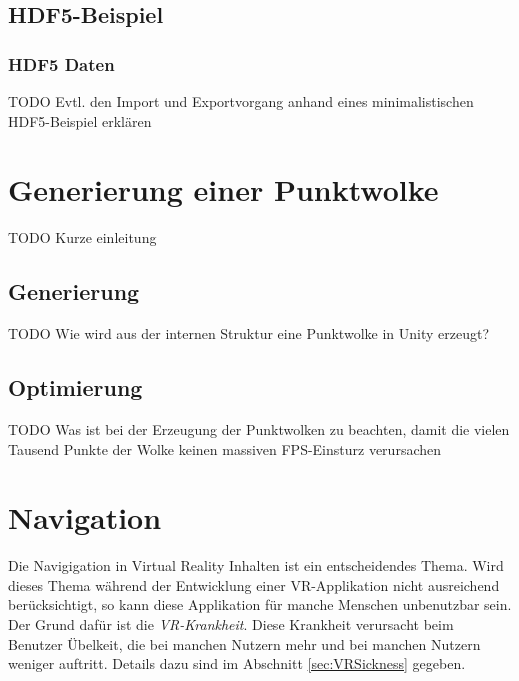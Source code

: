 \subsection{HDF5-Beispiel}
\subsubsection{HDF5 Daten}
\label{sec:HDF5}
TODO Evtl. den Import und Exportvorgang anhand eines minimalistischen HDF5-Beispiel erklären

\section{Generierung einer Punktwolke}
\label{sec:Generierung}
TODO Kurze einleitung



\subsection{Generierung}
\label{sec:PclGenerate}
TODO Wie wird aus der internen Struktur eine Punktwolke in Unity erzeugt?



\subsection{Optimierung}
\label{sec:Optimierung}
TODO Was ist bei der Erzeugung der Punktwolken zu beachten, damit die vielen Tausend Punkte der Wolke keinen massiven FPS-Einsturz verursachen

%	
%
%
%
%

\section{Navigation}
\label{sec:Navigation}
Die Navigigation in Virtual Reality Inhalten ist ein entscheidendes Thema. Wird dieses Thema während der Entwicklung einer VR-Applikation nicht ausreichend berücksichtigt, so kann diese Applikation für manche Menschen unbenutzbar sein. Der Grund dafür ist die \textit{VR-Krankheit}. Diese Krankheit verursacht beim Benutzer Übelkeit, die bei manchen Nutzern mehr und bei manchen Nutzern weniger auftritt. Details dazu sind im Abschnitt \ref{sec:VRSickness} gegeben. 

